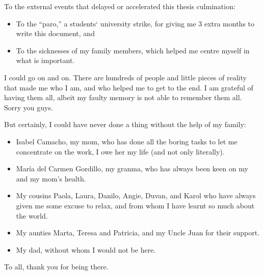 To the external events that delayed or accelerated this thesis culmination:

\begin{itemize}
\tightlist
\item To the \enquote{paro,} a students` university strike, for giving me 3 extra months to
  write this document,  and
\item To the sicknesses of my family members, which helped me centre myself in what is
  important.
\end{itemize}

I could go on and on. There are hundreds of people and little pieces of
reality that made me who I am, and who helped me to get to the end. I am
grateful of having them all, albeit my faulty memory is not able to remember them all.
Sorry you guys.

But certainly, I could have never done a thing without the help of my
family:

\begin{itemize}
\tightlist
\item Isabel Camacho, my mom, who has done all the boring tasks to let me concentrate
  on the work, I owe her my life (and not only literally).
\item María del Carmen Gordillo, my granma, who has always been keen on my and my
  mom's health.
\item My cousins Paola, Laura, Danilo, Angie, Duvan, and Karol who have always given me
  some excuse to relax, and from whom I have learnt so much about the world.
\item My aunties Marta, Teresa and Patricia, and my Uncle Juan for their support.
\item My dad, without whom I would not be here.
\end{itemize}

To all, thank you for being there.
